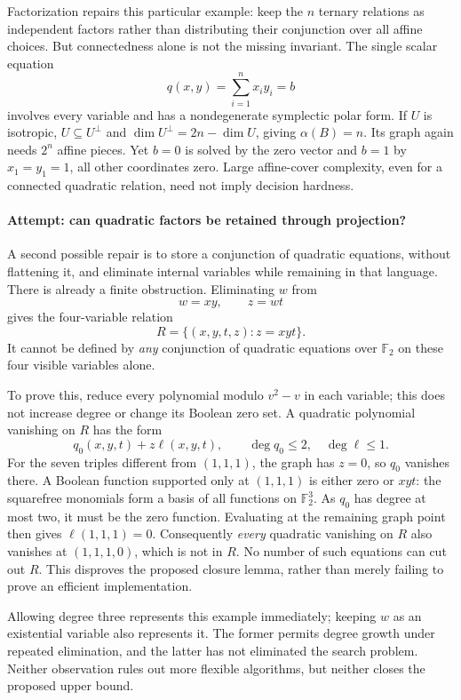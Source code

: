 \documentclass[11pt]{article}
\newcommand{\F}{\mathbb{F}}
\begin{document}
Factorization repairs this particular example: keep the $n$ ternary relations
as independent factors rather than distributing their conjunction over all
affine choices. But connectedness alone is not the missing invariant. The
single scalar equation
\[
                  q(x,y)=\sum_{i=1}^n x_i y_i=b
\]
involves every variable and has a nondegenerate symplectic polar form. If $U$
is isotropic, $U\subseteq U^\perp$ and $\dim U^\perp=2n-\dim U$, giving
$\alpha(B)=n$. Its graph again needs $2^n$ affine pieces. Yet $b=0$ is solved
by the zero vector and $b=1$ by $x_1=y_1=1$, all other coordinates zero.
Large affine-cover complexity, even for a connected quadratic relation, need
not imply decision hardness.

\paragraph{Attempt: can quadratic factors be retained through projection?}
A second possible repair is to store a conjunction of quadratic equations,
without flattening it, and eliminate internal variables while remaining in
that language. There is already a finite obstruction. Eliminating $w$ from
\[
                     w=xy,\qquad z=wt
\]
gives the four-variable relation
\begin{equation}\label{ra:1:cubic}
                   R=\{(x,y,t,z):z=xyt\}.
\end{equation}
It cannot be defined by \emph{any} conjunction of quadratic equations over
$\F_2$ on these four visible variables alone.

To prove this, reduce every polynomial modulo $v^2-v$ in each variable; this
does not increase degree or change its Boolean zero set. A quadratic
polynomial vanishing on $R$ has the form
\[
 q_0(x,y,t)+z\ell(x,y,t),\qquad \deg q_0\le2,\quad\deg\ell\le1.
\]
For the seven triples different from $(1,1,1)$, the graph has $z=0$, so $q_0$
vanishes there. A Boolean function supported only at $(1,1,1)$ is either zero
or $xyt$: the squarefree monomials form a basis of all functions on
$\F_2^3$. As $q_0$ has degree at most two, it must be the zero function.
Evaluating at the remaining graph point then gives $\ell(1,1,1)=0$.
Consequently \emph{every} quadratic vanishing on $R$ also vanishes at
$(1,1,1,0)$, which is not in $R$. No number of such equations can cut out $R$.
This disproves the proposed closure lemma, rather than merely failing to prove
an efficient implementation.

Allowing degree three represents this example immediately; keeping $w$ as an
existential variable also represents it. The former permits degree growth
under repeated elimination, and the latter has not eliminated the search
problem. Neither observation rules out more flexible algorithms, but neither
closes the proposed upper bound.
\end{document}
